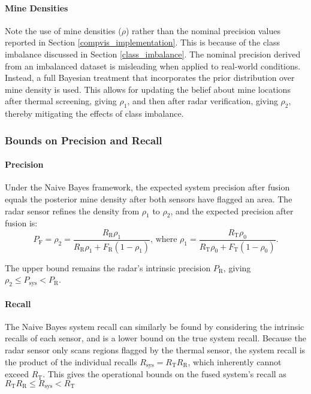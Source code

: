         \paragraph{Mine Densities} 
        

            Note the use of mine densities (\(\rho\)) rather than the nominal precision values reported in Section \ref{compvis_implementation}. This is because of the class imbalance discussed in Section \ref{class_imbalance}. The nominal precision derived from an imbalanced dataset is misleading when applied to real-world conditions. Instead, a full Bayesian treatment that incorporates the prior distribution over mine density is used. This allows for updating the belief about mine locations after thermal screening, giving \(\rho_1\), and then after radar verification, giving \(\rho_2\), thereby mitigating the effects of class imbalance.

        
    \subsubsection{Bounds on Precision and Recall}
    
        \paragraph{Precision} Under the Naive Bayes framework, the expected system precision after fusion equals the posterior mine density after both sensors have flagged an area. The radar sensor refines the density from $\rho_1$ to $\rho_2$, and the expected precision after fusion is:
        \begin{equation}
        \label{eq:rho_2}
        P_\text{F} = \rho_\text{2} = \frac{R_\text{R} \rho_\text{1}}{R_\text{R} \rho_\text{1} + F_\text{R} (1-\rho_\text{1})} \text{, where }         \rho_\text{1} = \frac{R_\text{T} \rho_\text{0}}{R_\text{T} \rho_\text{0} + F_\text{T} (1-\rho_\text{0})}.
        \end{equation}
        
         The upper bound remains the radar's intrinsic precision $P_\text{R}$, giving $\rho_\text{2} \leq P_\text{sys} < P_\text{R}$.
        
        \paragraph{Recall} The Naive Bayes system recall can similarly be found by considering the intrinsic recalls of each sensor, and is a lower bound on the true system recall. Because the radar sensor only scans regions flagged by the thermal sensor, the system recall is the product of the individual recalls \(R_\text{sys} = R_\text{T} R_\text{R}\), 
        which inherently cannot exceed $R_\text{T}$. This gives the operational bounds on the fused system's recall as $R_\text{T}R_\text{R}\leq R_\text{sys}< R_\text{T}$
    
